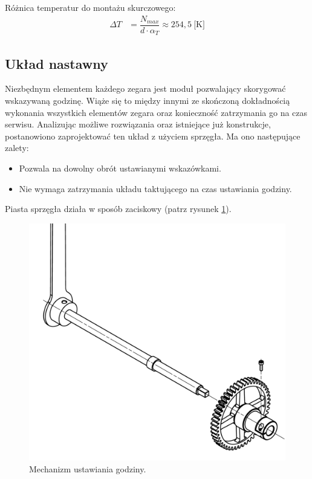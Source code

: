 		\noindent Różnica temperatur do montażu skurczowego:
		\begin{align}
			\Delta T &= \dfrac{N_{max}}{d \cdot \alpha_T} \approx 254,5 \ \text{[K]}
		\end{align}
		

        
        \subsection{Układ nastawny}
        Niezbędnym elementem każdego zegara jest moduł pozwalający skorygować wskazywaną godzinę.
        Wiąże się to między innymi ze skończoną dokładnością wykonania wszystkich elementów zegara oraz konieczność zatrzymania go na czas serwisu.
        Analizując możliwe rozwiązania oraz istniejące już konstrukcje, postanowiono zaprojektować ten układ z użyciem sprzęgła.
        Ma ono następujące zalety:
        \begin{itemize}
        	\item Pozwala na dowolny obrót ustawianymi wskazówkami.
        	\item Nie wymaga zatrzymania układu taktującego na czas ustawiania godziny.
        \end{itemize}
		Piasta sprzęgła działa w sposób zaciskowy (patrz rysunek \ref{fig:szpeglo}).
		
		\begin{figure}
			\centering
			\includegraphics[width=0.8\linewidth]{Projekt/szpeglo}
			\caption{Mechanizm ustawiania godziny.}
			\label{fig:szpeglo}
		\end{figure}
		
